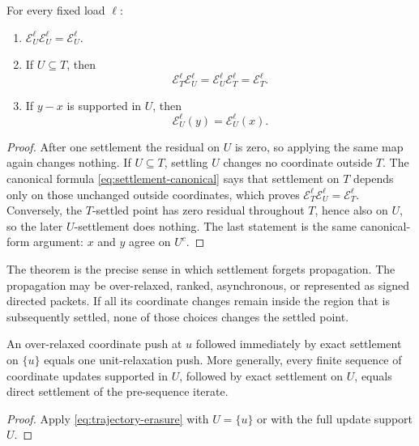 \begin{theorem}
\label{thm:settlement-absorption}
For every fixed load $\ell$:
\begin{enumerate}[label=(\roman*),leftmargin=*]
 \item $\mathcal E_U^\ell\mathcal E_U^\ell=\mathcal E_U^\ell$.
 \item If $U\subseteq T$, then
 \begin{equation}
  \mathcal E_T^\ell\mathcal E_U^\ell
  =\mathcal E_U^\ell\mathcal E_T^\ell
  =\mathcal E_T^\ell.
  \label{eq:nested-absorption}
 \end{equation}
 \item If $y-x$ is supported in $U$, then
 \begin{equation}
  \mathcal E_U^\ell(y)=\mathcal E_U^\ell(x).
  \label{eq:trajectory-erasure}
 \end{equation}
\end{enumerate}
\end{theorem}

\begin{proof}
After one settlement the residual on $U$ is zero, so applying the same map
again changes nothing.  If $U\subseteq T$, settling $U$ changes no coordinate
outside $T$.  The canonical formula \cref{eq:settlement-canonical} says that
settlement on $T$ depends only on those unchanged outside coordinates, which
proves $\mathcal E_T^\ell\mathcal E_U^\ell=\mathcal E_T^\ell$.
Conversely, the $T$-settled point has zero residual throughout $T$, hence
also on $U$, so the later $U$-settlement does nothing.  The last statement is
the same canonical-form argument: $x$ and $y$ agree on $U^c$.
\end{proof}

The theorem is the precise sense in which settlement forgets propagation.
The propagation may be over-relaxed, ranked, asynchronous, or represented as
signed directed packets.  If all its coordinate changes remain inside the
region that is subsequently settled, none of those choices changes the
settled point.

\begin{corollary}
\label{cor:cleanup-unification}
An over-relaxed coordinate push at $u$ followed immediately by exact
settlement on $\{u\}$ equals one unit-relaxation push.  More generally, every
finite sequence of coordinate updates supported in $U$, followed by exact
settlement on $U$, equals direct settlement of the pre-sequence iterate.
\end{corollary}

\begin{proof}
Apply \cref{eq:trajectory-erasure} with $U=\{u\}$ or with the full update
support $U$.
\end{proof}
